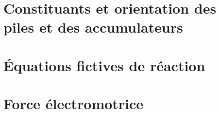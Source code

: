 \documentclass[a4paper]{article}
\begin{document}

\section{Constituants et orientation des piles et des accumulateurs}






%

\section{\'{E}quations fictives de réaction}



\section{Force électromotrice}





\end{document}
